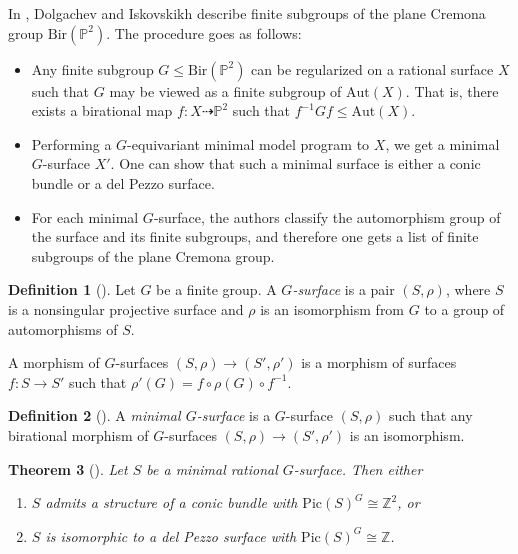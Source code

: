\documentclass[a4paper,12pt,oneside]{amsart}
\numberwithin{equation}{section}
\newtheorem{theorem}{Theorem}[section]
\theoremstyle{definition}
\newtheorem{definition}[theorem]{Definition}
\theoremstyle{remark}
\newcommand{\Pic}{\mathrm{Pic}}
\begin{document}
In \cite{dolgachev2009finitesubgroupsplanecremona}, Dolgachev and Iskovskikh describe finite subgroups of the plane Cremona group $\mathrm{Bir}(\mathbb{P}^2)$. The procedure goes as follows:
\begin{itemize}
    \item Any finite subgroup $G \leqslant \mathrm{Bir}(\mathbb{P}^2)$ can be regularized on a rational surface $X$ such that $G$ may be viewed as a finite subgroup of $\mathrm{Aut}(X)$. That is, there exists a birational map $f: X \dashrightarrow \mathbb{P}^2$ such that $f^{-1}Gf \leqslant \mathrm{Aut}(X)$.
    \item Performing a $G$-equivariant minimal model program to $X$, we get a minimal $G$-surface $X'$. One can show that such a minimal surface is either a conic bundle or a del Pezzo surface.
    \item For each minimal $G$-surface, the authors classify the automorphism group of the surface and its finite subgroups, and therefore one gets a list of finite subgroups of the plane Cremona group.
\end{itemize}
\begin{definition}[{\cite[Section 3.2]{dolgachev2009finitesubgroupsplanecremona}}]
Let $G$ be a finite group. A \emph{$G$-surface} is a pair $(S,\rho)$, where $S$ is a
nonsingular projective surface and $\rho$ is an isomorphism from $G$ to a group of
automorphisms of $S$.

A morphism of $G$-surfaces
\(
(S,\rho) \rightarrow (S',\rho')
\)
is a morphism of surfaces $f \colon S \to S'$ such that
\(
\rho'(G) = f \circ \rho(G) \circ f^{-1}.
\)
\end{definition}
\begin{definition}[{\cite[Definition~3.7]{dolgachev2009finitesubgroupsplanecremona}}]
A \emph{minimal $G$-surface} is a $G$-surface $(S,\rho)$ such that any birational
morphism of $G$-surfaces
\(
(S,\rho)\rightarrow (S',\rho')
\)
is an isomorphism. 
\end{definition}

\begin{theorem}[{\cite[Theorem~3.8]{dolgachev2009finitesubgroupsplanecremona}}]
Let $S$ be a minimal rational $G$-surface. Then either
\begin{enumerate}
  \item $S$ admits a structure of a conic bundle with $\Pic(S)^G \cong \mathbb Z^2$, or
  \item $S$ is isomorphic to a del Pezzo surface with $\Pic(S)^G \cong \mathbb Z$.
\end{enumerate}
\end{theorem}
\end{document}
